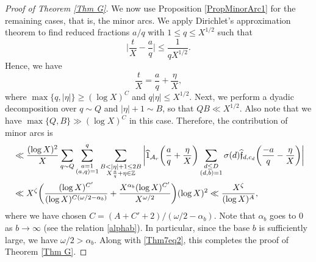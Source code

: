 \documentclass[12pt]{amsart}
\numberwithin{equation}{section}
\theoremstyle{remark}
\theoremstyle{definition}
\begin{document}
\begin{proof}[Proof of Theorem \ref{Thm G}]
We now use Proposition \ref{PropMinorArc1} for the remaining cases, that is, the minor arcs. We apply Dirichlet's approximation theorem to find reduced fractions $a/q$ with $1\leq q\leq X^{1/2}$ such that
\[ \bigg|\dfrac{t}{X}-\dfrac{a}{q}\bigg|\leq \dfrac{1}{qX^{1/2}}.\]
 Hence,  we have
 \[\dfrac{t}{X}=\dfrac{a}{q} + \dfrac{\eta}{X},\]
where $\max \{q, |\eta|\}\geq (\log X)^C$ and $q|\eta|\leq X^{1/2}$. Next, we perform a dyadic decomposition over $q\sim Q$ and $|\eta|+1\sim B$, so that $QB\ll X^{1/2}$. Also note that we have $\max\{Q, B\} \gg (\log X)^C$ in this case. Therefore, the contribution of minor arcs is
\begin{align}
\notag&\ll \dfrac{(\log X)^2}{X}\sum_{q\sim Q}\sum_{\substack{a=1\\(a,q)=1}}^q\sum_{\substack{B<|\eta|+1\leq 2B\\X\frac{a}{q} + \eta \in \mathbb{Z}}}\bigg|\widehat{1}_{\mathcal{A}_r}\bigg(\dfrac{a}{q}+\dfrac{\eta}{X}\bigg)\sum_{\substack{d\leq D\\(d, b)=1}}{\sigma}(d)\widehat{\mathfrak{f}}_{d, c_d}\bigg(\dfrac{-a}{q}-\dfrac{\eta}{X}\bigg)\bigg|\\
\notag &\ll X^{\zeta} \bigg(\dfrac{(\log X)^{C'}}{(\log X)^{C(\omega/2-\alpha_b)}} + \dfrac{X^{\alpha_b}(\log X)^{C'}}{X^{\omega/2}}\bigg)(\log X)^2\ll \dfrac{X^{\zeta}}{(\log X)^{A}},
\end{align}
where we have chosen $C=(A + C' +2)/(\omega/2-\alpha_b)$. Note that $\alpha_b$ goes to $0$ as $b\rightarrow \infty$ (see the relation \eqref{alphab}). In particular, since the base $b$ is sufficiently large, we have $\omega/2> \alpha_b$. Along with \eqref{Thm7eq2}, this completes the proof of Theorem \ref{Thm G}. 
\end{proof}
\end{document}
